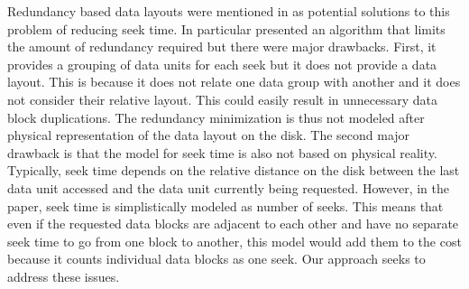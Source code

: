 \documentclass[conference]{acmsiggraph}
\begin{document}
Redundancy based data layouts were mentioned in \cite{Patterson88,singleseeklayout,optimizingredundancy} as potential solutions to this problem of reducing seek time. In particular \cite{optimizingredundancy} presented an algorithm that limits the amount of redundancy required but there were major drawbacks. First, it provides a grouping of data units for each seek but it does not provide a data layout. This is because it does not relate one data group with another and it does not consider their relative layout. This could easily result in unnecessary data block duplications. The redundancy minimization is thus not modeled after physical representation of the data layout on the disk. The second major drawback is that the model for seek time is also not based on physical reality. Typically, seek time depends on the relative distance on the disk between the last data unit accessed and the data unit currently being requested. However, in the paper, seek time is simplistically modeled as number of seeks. This means that even if the requested data blocks are adjacent to each other and have no separate seek time to go from one block to another, this model would add them to the cost because it counts individual data blocks as one seek. Our approach seeks to address these issues. 


\end{document}
